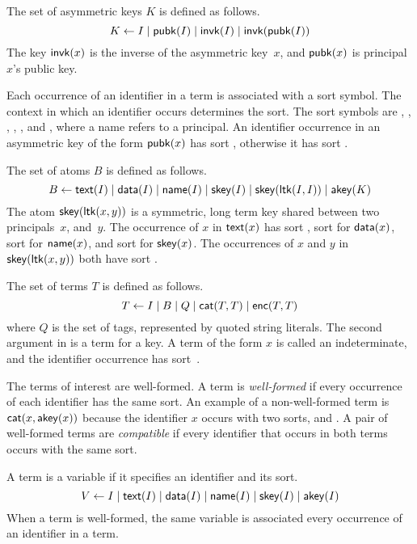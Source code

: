 \documentclass[12pt]{report}
\theoremstyle{definition}
\begin{document}
The set of asymmetric keys $K$ is defined as follows.
$$ K \leftarrow I \mid \operatorname{\mathsf{pubk}}(I) \mid \operatorname{\mathsf{invk}}(I) \mid
\operatorname{\mathsf{invk}}(\operatorname{\mathsf{pubk}}(I)) $$ The key $\operatorname{\mathsf{invk}}(x)$ is the inverse of
the asymmetric key~$x$, and $\operatorname{\mathsf{pubk}}(x)$ is principal $x$'s public
key.

Each occurrence of an identifier in a term is associated with a sort
symbol.  The context in which an identifier occurs determines the
sort.  The sort symbols are , , ,
, , and , where a name refers to a
principal.  An identifier occurrence in an asymmetric key of the form
$\operatorname{\mathsf{pubk}}(x)$ has sort , otherwise it has sort .

The set of atoms $B$ is defined as follows.
$$ B \leftarrow \operatorname{\mathsf{text}}(I) \mid \operatorname{\mathsf{data}}(I) \mid \operatorname{\mathsf{name}}(I) \mid
\operatorname{\mathsf{skey}}(I)\mid \operatorname{\mathsf{skey}}(\operatorname{\mathsf{ltk}}(I, I)) \mid \operatorname{\mathsf{akey}}(K) $$ The
atom $\operatorname{\mathsf{skey}}(\operatorname{\mathsf{ltk}}(x, y))$ is a symmetric, long term key
shared between two principals~$x$, and~$y$.  The occurrence of $x$ in
$\operatorname{\mathsf{text}}(x)$ has sort , sort  for
$\operatorname{\mathsf{data}}(x)$, sort  for $\operatorname{\mathsf{name}}(x)$, and sort
 for $\operatorname{\mathsf{skey}}(x)$.  The occurrences of $x$ and $y$ in
$\operatorname{\mathsf{skey}}(\operatorname{\mathsf{ltk}}(x,y))$ both have sort .

The set of terms $T$ is defined as follows.
$$ T \leftarrow I \mid B \mid Q \mid \operatorname{\mathsf{cat}}(T, T) \mid \operatorname{\mathsf{enc}}(T,
T)$$ where $Q$ is the set of tags, represented by quoted string
literals.  The second argument in  is a term for a key.  A
term of the form $x$ is called an indeterminate, and the identifier
occurrence has sort~.

The terms of interest are well-formed.  A term
is \emph{well-formed} if every occurrence of each identifier has the
same sort.  An example of a non-well-formed term is
$\operatorname{\mathsf{cat}}(x,\operatorname{\mathsf{akey}}(x))$ because the identifier $x$ occurs with two
sorts,  and .  A pair of well-formed terms are
\emph{compatible} if every identifier that
occurs in both terms occurs with the same sort.

A term is a variable if it specifies an identifier and its sort.
$$ V \leftarrow I \mid \operatorname{\mathsf{text}}(I)  \mid \operatorname{\mathsf{data}}(I) \mid \operatorname{\mathsf{name}}(I) \mid
\operatorname{\mathsf{skey}}(I)\mid \operatorname{\mathsf{akey}}(I) $$ When a term is well-formed, the same
variable is associated every occurrence of an identifier in a term.
\end{document}

